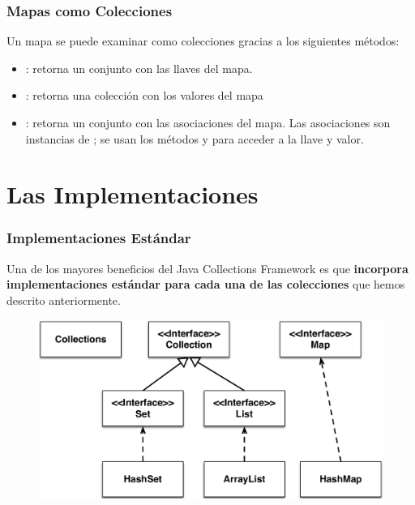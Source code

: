 \documentclass{beamer}
\begin{document}
\begin{frame}
  \frametitle{Mapas como Colecciones}

  Un mapa  se puede examinar como colecciones gracias
  a los siguientes métodos:

  \begin{itemize}
  \item {}: retorna un conjunto con las llaves
    del mapa.
    
  \item {}: retorna una colección con los
    valores del mapa

  \item {}: retorna un conjunto
    con las asociaciones del mapa. Las asociaciones son instancias de
    ; se usan los métodos  y
     para acceder a la llave y valor.
    
  \end{itemize}
  
\end{frame}

\section{Las Implementaciones}

\begin{frame}
  \frametitle{Implementaciones Estándar}

  Una de los mayores beneficios del Java Collections Framework es que
  \textbf{incorpora implementaciones estándar para cada una de las
    colecciones} que hemos descrito anteriormente.

  \begin{figure}
    \centering
    \includegraphics[scale=0.5]{collections_hierarchy_2}
  \end{figure}
  
\end{frame}
\end{document}
